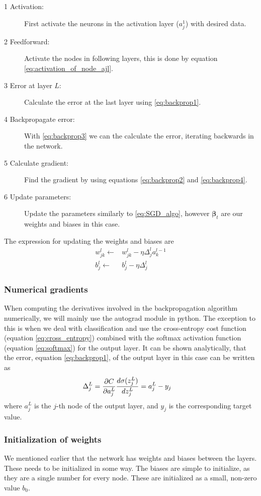 \documentclass[12pt]{extarticle}
\begin{document}
\begin{description}
	\item[1 Activation:] First activate the neurons in the activation layer ($a^1_j$) with desired data.
	\item[2 Feedforward:] Activate the nodes in following layers, this is done by equation \eqref{eq:activation_of_node_ajl}.
	\item[3 Error at layer $L$:] Calculate the error at the last layer using \eqref{eq:backprop1}.
	\item[4 Backpropagate error:] With \eqref{eq:backprop3} we can the calculate the error, iterating backwards in the network.
	\item[5 Calculate gradient:] Find the gradient by using equations \eqref{eq:backprop2} and \eqref{eq:backprop4}.
	\item[6 Update parameters:] Update the parameters similarly to \eqref{eq:SGD_algo}, however $\boldsymbol{\beta}_t$ are our weights and biases in this case.
\end{description}

The expression for updating the weights and biases are
\begin{align}
	w_{jk}^l \leftarrow & w_{jk}^l - \eta \Delta_j^l a_k^{l-1} \label{eq:update_weights} \\
	b_j^l \leftarrow    & b_j^l - \eta \Delta_j^l \label{eq:update_biases}
\end{align}

\subsubsection{Numerical gradients} \label{sec:num_gradients}
When computing the derivatives involved in the backpropagation algorithm numerically, we will mainly use the autograd module in python. The exception to this is when we deal with classification and use the cross-entropy cost function (equation \eqref{eq:cross_entropy}) combined with the softmax activation function (equation \eqref{eq:softmax}) for the output layer. It can be shown analytically, that the error, equation \eqref{eq:backprop1}, of the output layer in this case can be written as 
\begin{align} \label{eq:softmax_crossentropy_derivative}
	\Delta_j^L &= \frac{\partial C}{\partial a_j^L}\frac{d \sigma(z_j^L)}{d z_j^L} = a_j^L - y_j
\end{align} 
where $a_j^L$ is the $j$-th node of the output layer, and $y_j$ is the corresponding target value. 

\subsubsection{Initialization of weights} \label{sec:wi}
We mentioned earlier that the network has weights and biases between the layers. These needs to be initialized in some way. The biases are simple to initialize, as they are a single number for every node. These are initialized as a small, non-zero value $b_0$.
\end{document}
